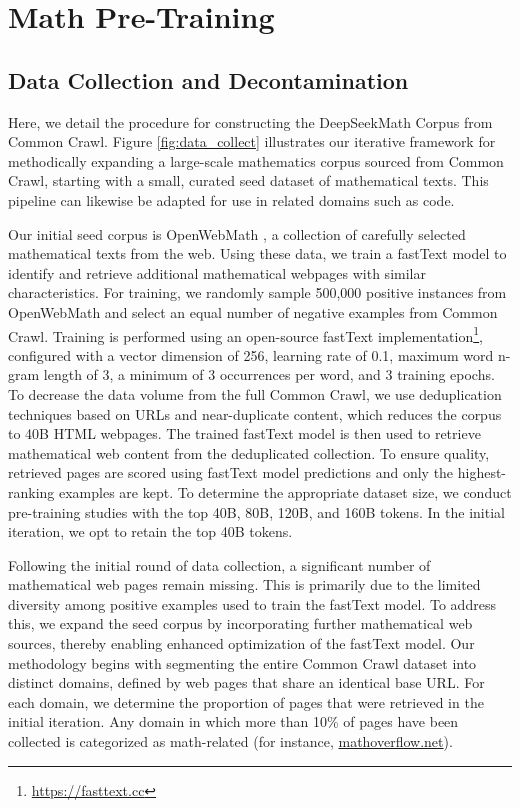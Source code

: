\section{Math Pre-Training}

\subsection{Data Collection and Decontamination}
Here, we detail the procedure for constructing the DeepSeekMath Corpus from Common Crawl. Figure \ref{fig:data_collect} illustrates our iterative framework for methodically expanding a large-scale mathematics corpus sourced from Common Crawl, starting with a small, curated seed dataset of mathematical texts. This pipeline can likewise be adapted for use in related domains such as code.

Our initial seed corpus is OpenWebMath \citep{openwebmath}, a collection of carefully selected mathematical texts from the web. Using these data, we train a fastText model \citep{joulin2016fasttext} to identify and retrieve additional mathematical webpages with similar characteristics. For training, we randomly sample 500,000 positive instances from OpenWebMath and select an equal number of negative examples from Common Crawl. Training is performed using an open-source fastText implementation\footnote{\url{https://fasttext.cc}}, configured with a vector dimension of 256, learning rate of 0.1, maximum word n-gram length of 3, a minimum of 3 occurrences per word, and 3 training epochs. To decrease the data volume from the full Common Crawl, we use deduplication techniques based on URLs and near-duplicate content, which reduces the corpus to 40B HTML webpages. The trained fastText model is then used to retrieve mathematical web content from the deduplicated collection. To ensure quality, retrieved pages are scored using fastText model predictions and only the highest-ranking examples are kept. To determine the appropriate dataset size, we conduct pre-training studies with the top 40B, 80B, 120B, and 160B tokens. In the initial iteration, we opt to retain the top 40B tokens.

Following the initial round of data collection, a significant number of mathematical web pages remain missing. This is primarily due to the limited diversity among positive examples used to train the fastText model. To address this, we expand the seed corpus by incorporating further mathematical web sources, thereby enabling enhanced optimization of the fastText model. Our methodology begins with segmenting the entire Common Crawl dataset into distinct domains, defined by web pages that share an identical base URL. For each domain, we determine the proportion of pages that were retrieved in the initial iteration. Any domain in which more than 10\% of pages have been collected is categorized as math-related (for instance, \url{mathoverflow.net}). 

